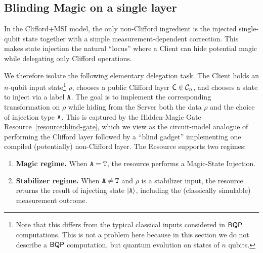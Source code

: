 \subsection{Blinding Magic on a single layer}
\label{subsection:blind:gadget}

In the Clifford+MSI model, the only non-Clifford ingredient is the injected single-qubit state together with a simple measurement-dependent correction. This makes state injection the natural ``locus'' where a Client can hide potential magic while delegating only Clifford operations.

We therefore isolate the following elementary delegation task. The Client holds an $n$-qubit input state\footnote{Note that this differs from the typical classical inputs considered in $\textsf{BQP}$ computations. This is not a problem here because in this section we do not describe a $\textsf{BQP}$ computation, but quantum evolution on states of $n$ qubits.} $\rho$, chooses a public Clifford layer $\mathsf{C}\in\mathcal{C}_n$, and chooses a state to inject via a label $\mathtt{A}$.
The goal is to implement the corresponding transformation on $\rho$ while hiding from the Server both the data $\rho$ and the choice of injection type $\mathtt{A}$.
This is captured by the Hidden-Magic Gate Resource~\ref{resource:blind-gate}, which we view as the circuit-model analogue of performing the Clifford layer followed by a ``blind gadget'' implementing one compiled (potentially) non-Clifford layer. The Resource supports two regimes:
\begin{enumerate}
    \item \textbf{Magic regime.} When $\mathtt{A}=\mathtt{T}$, the resource performs a Magic-State Injection.
    \item \textbf{Stabilizer regime.} When $\mathtt{A}\neq \mathtt{T}$ and $\rho$ is a stabilizer input, the resource returns the result of injecting state $\ket{\mathtt{A}}$, including the (classically simulable) measurement outcome.
\end{enumerate}

